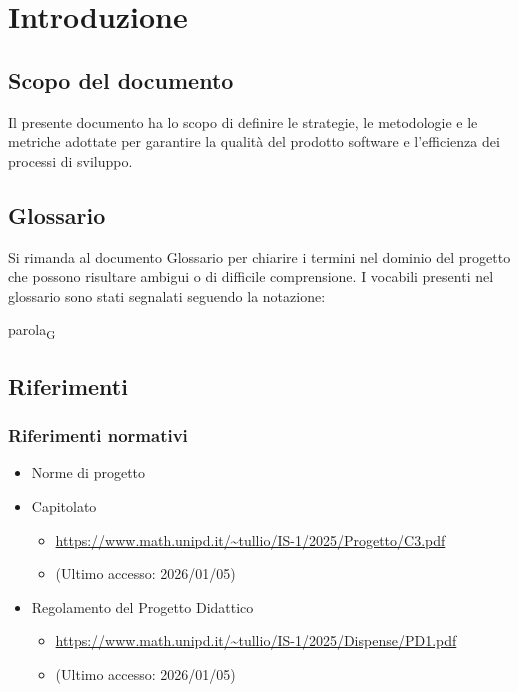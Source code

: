 \documentclass[a4paper,12pt]{article}
\begin{document}
    \section{Introduzione} {
        \subsection{Scopo del documento}
            Il presente documento ha lo scopo di definire le strategie, le metodologie e le metriche adottate per garantire la qualità del prodotto software e l'efficienza dei processi di sviluppo.

        \subsection{Glossario}
            Si rimanda al documento Glossario per chiarire i termini nel dominio del progetto che possono risultare ambigui o di difficile comprensione. I vocabili presenti nel glossario sono stati segnalati seguendo la notazione:
            \begin{center}
                parola\textsubscript{G}
            \end{center}
        \subsection{Riferimenti}
            \subsubsection{Riferimenti normativi}
                \begin{itemize}
                    \item Norme di progetto
                    \item Capitolato
                    \begin{itemize}
                        \item \url{https://www.math.unipd.it/~tullio/IS-1/2025/Progetto/C3.pdf}
                         \item[] (Ultimo accesso: 2026/01/05)
                    \end{itemize}
                    \item Regolamento del Progetto Didattico
                    \begin{itemize}
                        \item \url{https://www.math.unipd.it/~tullio/IS-1/2025/Dispense/PD1.pdf}
                         \item[] (Ultimo accesso: 2026/01/05)
                    \end{itemize}
                \end{itemize}
}
\end{document}
